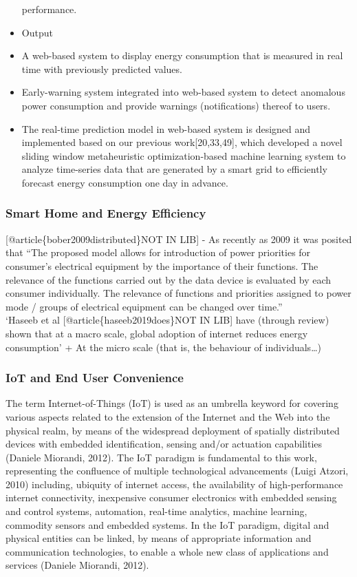 \documentclass[11pt,]{article}
\begin{document}
\begin{itemize}
  performance.
\item
  Output
\item
  A web-based system to display energy consumption that is measured in
  real time with previously predicted values.
\item
  Early-warning system integrated into web-based system to detect
  anomalous power consumption and provide warnings (notifications)
  thereof to users.
\item
  The real-time prediction model in web-based system is designed and
  implemented based on our previous work{[}20,33,49{]}, which developed
  a novel sliding window metaheuristic optimization-based machine
  learning system to analyze time-series data that are generated by a
  smart grid to efficiently forecast energy consumption one day in
  advance.
\end{itemize}

\hypertarget{smart-home-and-energy-efficiency}{%
\subsubsection{Smart Home and Energy
Efficiency}\label{smart-home-and-energy-efficiency}}

{[}@article\{bober2009distributed\}NOT IN LIB{]} - As recently as 2009
it was posited that ``The proposed model allows for introduction of
power priorities for consumer's electrical equipment by the importance
of their functions. The relevance of the functions carried out by the
data device is evaluated by each consumer individually. The relevance of
functions and priorities assigned to power mode / groups of electrical
equipment can be changed over time.''\\
`Haseeb et al {[}@article\{haseeb2019does\}NOT IN LIB{]} have (through
review) shown that at a macro scale, global adoption of internet reduces
energy consumption' + At the micro scale (that is, the behaviour of
individuals\ldots)

\hypertarget{iot-and-end-user-convenience}{%
\subsubsection{IoT and End User
Convenience}\label{iot-and-end-user-convenience}}

The term Internet-of-Things (IoT) is used as an umbrella keyword for
covering various aspects related to the extension of the Internet and
the Web into the physical realm, by means of the widespread deployment
of spatially distributed devices with embedded identification, sensing
and/or actuation capabilities (Daniele Miorandi, 2012). The IoT paradigm
is fundamental to this work, representing the confluence of multiple
technological advancements (Luigi Atzori, 2010) including, ubiquity of
internet access, the availability of high-performance internet
connectivity, inexpensive consumer electronics with embedded sensing and
control systems, automation, real-time analytics, machine learning,
commodity sensors and embedded systems. In the IoT paradigm, digital and
physical entities can be linked, by means of appropriate information and
communication technologies, to enable a whole new class of applications
and services (Daniele Miorandi, 2012).
\end{document}
